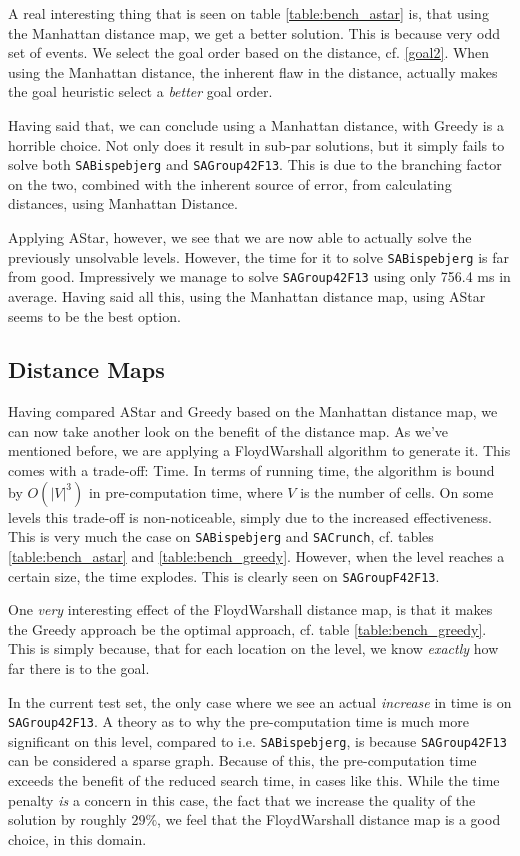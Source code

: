\documentclass[letterpaper]{article}
\begin{document}
		A real interesting thing that is seen on table \ref{table:bench_astar} is, that using the Manhattan distance map, we get a better solution. This is because very odd set of events. We select the goal order based on the distance, cf. \ref{goal2}. When using the Manhattan distance, the inherent flaw in the distance, actually makes the goal heuristic select a \emph{better} goal order.

		Having said that, we can conclude using a Manhattan distance, with Greedy is a horrible choice. Not only does it result in sub-par solutions, but it simply fails to solve both \verb=SABispebjerg= and \verb=SAGroup42F13=. This is due to the branching factor on the two, combined with the inherent source of error, from calculating distances, using Manhattan Distance. 

		Applying AStar, however, we see that we are now able to actually solve the previously unsolvable levels. However, the time for it to solve \verb=SABispebjerg= is far from good. Impressively we manage to solve \verb=SAGroup42F13= using only 756.4 ms in average. Having said all this, using the Manhattan distance map, using AStar seems to be the best option.


	\subsection{Distance Maps}
		Having compared AStar and Greedy based on the Manhattan distance map, we can now take another look on the benefit of the distance map. As we've mentioned before, we are applying a FloydWarshall algorithm to generate it. This comes with a trade-off: Time. In terms of running time, the algorithm is bound by $O(|V|^3)$ in pre-computation time, where $V$ is the number of cells. On some levels this trade-off is non-noticeable, simply due to the increased effectiveness. This is very much the case on \verb=SABispebjerg= and \verb=SACrunch=, cf. tables \ref{table:bench_astar} and \ref{table:bench_greedy}. However, when the level reaches a certain size, the time explodes. This is clearly seen on \verb=SAGroupF42F13=.

		One \emph{very} interesting effect of the FloydWarshall distance map, is that it makes the Greedy approach be the optimal approach, cf. table \ref{table:bench_greedy}. This is simply because, that for each location on the level, we know \emph{exactly} how far there is to the goal.

		In the current test set, the only case where we see an actual \emph{increase} in time is on \verb=SAGroup42F13=. A theory as to why the pre-computation time is much more significant on this level, compared to i.e. \verb=SABispebjerg=, is because \verb=SAGroup42F13= can be considered a sparse graph. Because of this, the pre-computation time exceeds the benefit of the reduced search time, in cases like this. While the time penalty \emph{is} a concern in this case, the fact that we increase the quality of the solution by roughly $29\%$, we feel that the FloydWarshall distance map is a good choice, in this domain.
\end{document}
